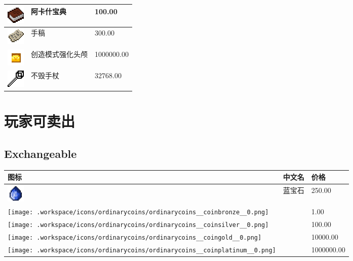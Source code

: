 \documentclass[UTF8]{ctexart}
\begin{document}
\begin{longtable}[]{|p{1cm}|p{8cm}|p{1.5cm}|}
	\hline
	\includegraphics{.workspace/icons/akashictome/akashictome__tome__0.png} & 阿卡什宝典 &100.00\\
	\hline
	\includegraphics{.workspace/icons/iceandfire/iceandfire__manuscript__0.png} & 手稿 &300.00\\
	\hline
	\includegraphics{.workspace/icons/tconstruct/tconstruct__materials__50.png} & 创造模式强化头颅 &1000000.00\\
	\hline
	\includegraphics{.workspace/icons/betterbuilderswands/betterbuilderswands__wandunbreakable__12.png} & 不毁手杖 &32768.00\\
	\hline

\end{longtable}
\section{玩家可卖出}

\subsection{Exchangeable}
\begin{longtable}[]{|p{1cm}|p{8cm}|p{1.5cm}|}
\toprule
图标 & 中文名 & 价格\\
\midrule
	\includegraphics{.workspace/icons/iceandfire/iceandfire__sapphire_gem__0.png} & 蓝宝石 &250.00\\
	\hline
	\texttt{[image: .workspace/icons/ordinarycoins/ordinarycoins\_\_coinbronze\_\_0.png]} &  &1.00\\
	\hline
	\texttt{[image: .workspace/icons/ordinarycoins/ordinarycoins\_\_coinsilver\_\_0.png]} &  &100.00\\
	\hline
	\texttt{[image: .workspace/icons/ordinarycoins/ordinarycoins\_\_coingold\_\_0.png]} &  &10000.00\\
	\hline
	\texttt{[image: .workspace/icons/ordinarycoins/ordinarycoins\_\_coinplatinum\_\_0.png]} &  &1000000.00\\
	\hline

\end{longtable}
\end{document}
